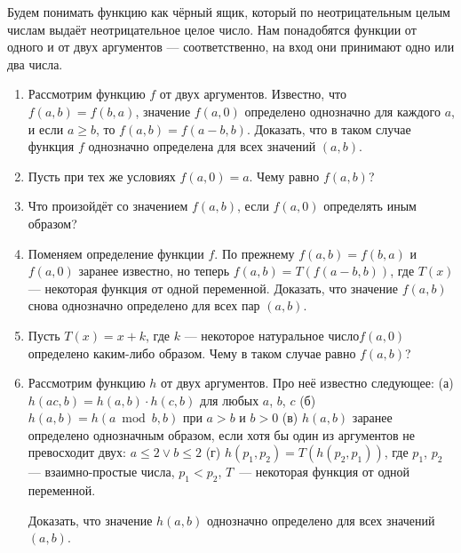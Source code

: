 
\ms Будем понимать функцию как чёрный ящик, который по неотрицательным целым числам выдаёт 
неотрицательное целое число. Нам понадобятся функции от одного и от двух аргументов --- соответственно, 
на вход они принимают одно или два числа.

\begin{enumerate}

\item Рассмотрим функцию $f$ от двух аргументов. Известно, что $f(a,b) = f(b,a)$, значение $f(a,0)$ определено однозначно для каждого $a$, и если $a \ge b$, то $f(a,b) = f(a-b,b)$. Доказать, что в таком случае функция $f$ однозначно определена для всех значений $(a,b)$.

\item Пусть при тех же условиях $f(a,0)=a$. Чему равно $f(a,b)$?

\item Что произойдёт со значением $f(a,b)$, если $f(a,0)$ определять иным образом?

\item Поменяем определение функции $f$. По прежнему $f(a,b) = f(b,a)$ и $f(a,0)$ заранее известно, но теперь $f(a,b) = T(f(a-b,b))$, где $T(x)$ --- некоторая функция от одной переменной. Доказать, что значение $f(a,b)$ снова однозначно определено для всех пар $(a,b)$.

\item Пусть $T(x) = x+k$, где $k$ --- некоторое натуральное число\scolon $f(a,0)$ определено каким-либо образом. Чему в таком случае равно $f(a,b)$?

\item Рассмотрим функцию $h$ от двух аргументов. Про неё известно следующее:
  \subitem (а) $h(ac,b) = h(a,b) \cdot h(c,b)$ для любых $a$, $b$, $c$\scolon
  \subitem (б) $h(a,b) = h(a \bmod b, b)$ при $a>b$ и $b > 0$\scolon
  \subitem (в) $h(a,b)$ заранее определено однозначным образом, если хотя бы один из аргументов не превосходит двух:
$a \le 2 \vee b \le 2$\scolon
  \subitem (г) $h(p_1,p_2) = T(h(p_2,p_1))$, где $p_1$, $p_2$ --- взаимно-простые числа, $p_1<p_2$, $T$~--- 
     некоторая функция от одной переменной.

\ms Доказать, что значение $h(a,b)$ однозначно определено для всех значений $(a,b)$.

\end{enumerate}